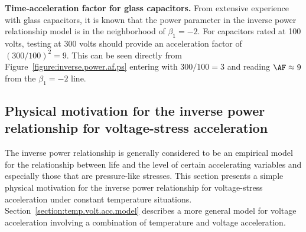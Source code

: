 \begin{example}
{\bf Time-acceleration factor for glass capacitors.} From extensive
experience with glass capacitors, it is known that the power parameter
in the inverse power relationship model is in the neighborhood of $\beta_{1}=-2$.  For
capacitors rated at 100 volts, testing at 300 volts should provide an
acceleration factor of $(300/100)^{2}=9$. This can be seen directly
from Figure~\ref{figure:inverse.power.af.ps} entering with $300/100=3$
and reading $\AF \approx 9$ from the $\beta_{1}=-2$ line.
\end{example}

\subsection{Physical motivation for the inverse power relationship
for voltage-stress acceleration}
\label{section:ivp.physical.motivation}
The inverse power relationship is generally considered to be an
empirical model for the relationship between life and the
level of certain accelerating variables and especially those that are
pressure-like stresses.  This section presents a simple physical
motivation for the inverse power relationship for voltage-stress acceleration
under constant temperature situations.
Section~\ref{section:temp.volt.acc.model} describes a more general
model for voltage acceleration involving a combination of temperature
and voltage acceleration.

